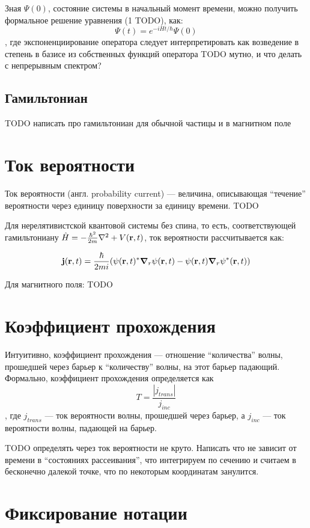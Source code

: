 Зная $\Psi(0)$, состояние системы в начальный момент времени, можно получить формальное решение уравнения (1 TODO), как:
\[
\Psi(t) = e^{-i H t / \hbar} \Psi(0)
\]
, где экспоненциирование оператора следует интерпретировать как возведение в степень в базисе из собственных функций оператора TODO мутно, и что делать с непрерывным спектром?

\subsection{Гамильтониан}
TODO написать про гамильтониан для обычной частицы и в магнитном поле

\section{Ток вероятности}
Ток вероятности (англ. probability current) — величина, описывающая ``течение'' вероятности через единицу поверхности за единицу времени. TODO 


Для нерелятивистской квантовой системы без спина, то есть, соответствующей гамильтониану $\hat{H} = - \frac{\hbar^2}{2m} \laplacian + V(\vb{r}, t)$, ток вероятности рассчитывается как:

\[
\vb{j}(\vb{r}, t) = \frac{\hbar}{2 m i} (\psi(\vb{r}, t)^* \grad_r{\psi(\vb{r}, t)} - \psi(\vb{r}, t) \grad_r{\psi^*(\vb{r}, t))}
\]

Для магнитного поля: TODO

\section{Коэффициент прохождения}
Интуитивно, коэффициент прохождения — отношение ``количества'' волны, прошедшей через барьер к ``количеству'' волны, на этот барьер падающий. Формально, коэффициент прохождения определяется как
\[
T = \frac{|j_{trans}|}{j_{inc}}
\]
, где $j_{trans}$ — ток вероятности волны, прошедшей через барьер, а $j_{inc}$ — ток вероятности волны, падающей на барьер.

TODO определять через ток вероятности не круто. Написать что не зависит от времени в ``состояниях рассеивания'', что интегрируем по сечению и считаем в бесконечно далекой точке, что по некоторым координатам занулится.

\section{Фиксирование нотации}

